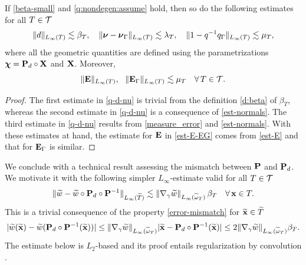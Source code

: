\begin{corollary} \label{C:lambda-2}
If \eqref{beta-small} and \eqref{q:nondegen:assume} hold, then
so do the following estimates for all $T\in\mathcal{T}$
%
\begin{equation}\label{q-d-nu}
  \|d\|_{L_\infty(T)} \lesssim \beta_T,
  \quad
  \|{\boldsymbol \nu} - {\boldsymbol \nu}_\Gamma \|_{L_\infty(T)} \lesssim \lambda_T,
  \quad
  \| 1 - q^{-1} q_\Gamma\|_{L_\infty(T)} \lesssim \mu_T,
\end{equation}
%
where all the geometric quantities are defined using the parametrizations
${\boldsymbol \chi} = {\bf P}_d \circ {\bf X}$ and ${\bf X}$.
%
Moreover,
%
\begin{equation}\label{est-E-EG}
  \|{\bf E}\|_{L_\infty(T)} , ~~ \|{\bf E}_\Gamma\|_{L_\infty(T)} \lesssim \mu_T
  \quad\forall \, T\in\mathcal{T}.
\end{equation}
%
\end{corollary}
%
\begin{proof}
The first estimate in \eqref{q-d-nu} is trivial from the definition \eqref{d:beta}
of $\beta_T$, whereas the second estimate in \eqref{q-d-nu} is a consequence of
\eqref{est-normals}. The third estimate in \eqref{q-d-nu} results from 
\eqref{measure_error} and \eqref{est-normals}. With these estimates at hand,
the estimate for ${\bf E}$ in \eqref{est-E-EG} comes from \eqref{est-E} and that
for ${\bf E}_\Gamma$ is similar.
\end{proof}

 
We conclude with a technical result assessing the mismatch between ${\bf P}$ and ${\bf P}_d$.
We motivate it with the following simpler $L_\infty$-estimate valid for all $T\in\mathcal{T}$
%
\[
\| \widetilde w - \widetilde w \circ {\bf P}_d \circ {\bf P}^{-1}\|_{L_\infty(\widetilde T)}
\lesssim \| \nabla_\gamma \widetilde w \|_{L_{\infty}(\widetilde{\omega}_T)} \, \beta_T
\quad\forall \, {\bf x}\in T.
\]
%
This is a trivial consequence of the property \eqref{error-mismatch}
for $\widetilde{{\bf x}} \in \widetilde{T}$
%
\[
| \widetilde{w}(\widetilde {{\bf x}}) - \widetilde{w} ( {\bf P}_d \circ {\bf P}^{-1}(\widetilde {{\bf x}}))|
\leq \| \nabla_\gamma \widetilde w \|_{L_{\infty}(\widetilde{\omega}_T)} | \widetilde {{\bf x}} -   {\bf P}_d \circ {\bf P}^{-1}(\widetilde{{\bf x}})|\le 2 \| \nabla_\gamma \widetilde w \|_{L_{\infty}(\widetilde{\omega}_T)} \beta_T.
\]
%
The estimate below is $L_2$-based and its proof entails regularization by convolution
\cite[Lemma~3.4]{BD:18}.

